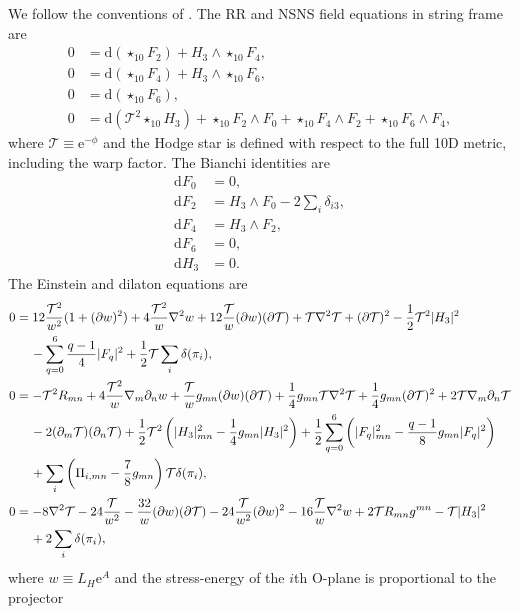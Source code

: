 \documentclass[11pt]{article}
\newcommand{\nl}{\notag \\ &\quad\,}
\renewcommand{\[}{\left[}
\renewcommand{\]}{\right]}
\renewcommand{\(}{\left(}
\renewcommand{\)}{\right)}
\renewcommand{\d}{\textrm{d}}
\newcommand{\e}{\textrm{e}}
\newcommand{\<}{\langle}
\renewcommand{\>}{\rangle}
\begin{document}
We follow the conventions of \cite{Junghans:2020acz}. The RR and NSNS field equations in string frame are
\begin{align}
    0&=\d (\star_{10} F_2) + H_3 \wedge \star_{10} F_4, \label{eq:App_F2EoM}\\
     0&=\d (\star_{10} F_4) + H_3 \wedge \star_{10} F_6,\\
      0&=\d (\star_{10} F_6),\\
       0&=\d (\mathcal{T}^2\star_{10} H_3) +\star_{10} F_2 \wedge F_0 + \star_{10}F_4 \wedge F_2 + \star_{10}F_6 \wedge F_4,
\end{align}
where $\mathcal{T} \equiv \e^{-\phi}$ and the Hodge star is defined with respect to the full 10D metric, including the warp factor. The Bianchi identities are
\begin{align}
    \d F_0&=0,\\
    \d F_2&=H_3 \wedge F_0 - 2 \sum_i \delta_{i3},\\
    \d F_4&=H_3 \wedge F_2,\\
    \d F_6&=0,\\
    \d H_3&=0.
\end{align}
The Einstein and dilaton equations are 
\begin{align}
    0&=12 \frac{\mathcal{T}^2}{w^2} (1+ (\partial w)^2) + 4 \frac{\mathcal{T}^2}{w} \nabla^2 w + 12 \frac{\mathcal{T}}{w}(\partial w) (\partial \mathcal{T}) + \mathcal{T}\nabla^2 \mathcal{T} + (\partial \mathcal{T})^2 - \frac12 \mathcal{T}^2 |H_3|^2\nl
     -\sum_{q=0}^6\frac{q-1}{4}|F_q|^2 + \frac12 \mathcal{T} \sum_i \delta(\pi_i),\\
    0&=-\mathcal{T}^2 R_{mn} + 4 \frac{\mathcal{T}^2}{w}\nabla_m\partial_n w + \frac{\mathcal{T}}{w}g_{mn}(\partial w)(\partial\mathcal{T}) + \frac14 g_{mn } \mathcal{T}\nabla^2 \mathcal{T} + \frac14 g_{mn}(\partial\mathcal{T})^2 + 2 \mathcal{T}\nabla_m\partial_n \mathcal{T}\nl
    -2 (\partial_m \mathcal{T})(\partial_n \mathcal{T}) + \frac12 \mathcal{T}^2\left(|H_3|^2_{mn}-\frac14 g_{mn}|H_3|^2\right)+\frac12 \sum_{q=0}^6 \left(|F_q|^2_{mn} - \frac{q-1}{8}g_{mn}|F_q|^2\right)\nl
    +\sum_i\left(\Pi_{i,mn}-\frac78 g_{mn}\right)\mathcal{T}\delta(\pi_i),\\
    0&=-8 \nabla^2 \mathcal{T}-24 \frac{\mathcal{T}}{w^2}-\frac{32}{w}(\partial w)(\partial \mathcal{T}) - 24 \frac{\mathcal{T}}{w^2}(\partial w)^2 - 16 \frac{\mathcal{T}}{w}\nabla^2 w + 2 \mathcal{T} R_{mn}g^{mn}-\mathcal{T}|H_3|^2 \nl
    +2 \sum_i \delta(\pi_i),
\end{align}
where $w \equiv L_H \e^A$ and the stress-energy of the $i$th O-plane is proportional to the projector
\end{document}
